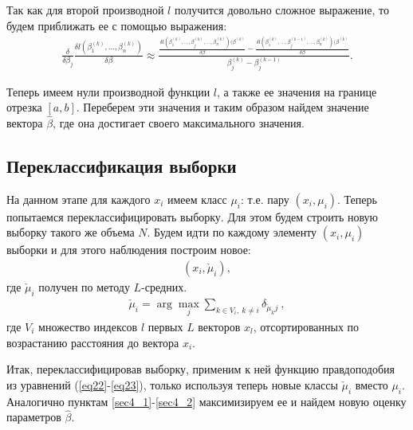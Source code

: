 \documentclass[a4paper,14pt]{extarticle}
\begin{document}
Так как для второй производной $l$ получится довольно сложное выражение, то будем приближать ее с помощью выражения:
\begin{eqnarray}
    \frac{\delta }{\delta \beta_j}\frac{\delta l(\beta_1^{(k)},\dots, \beta_n^{(k)}) }{\delta \beta}\approx \frac{\frac{\delta l(\beta_1^{(k)},\dots,\beta_j^{(k)},\dots, \beta_n^{(k)}) (\beta^{(k)}}{\delta \beta}-\frac{\delta l(\beta_1^{(k)},\dots,\beta_j^{(k-1)},\dots, \beta_n^{(k)}) (\beta^{(k)}}{\delta \beta}}{\beta_j^{(k)}-\beta_j^{(k-1)}}.
\end{eqnarray}

Теперь имеем нули производной функции $l$, а также ее значения на границе отрезка $[a,b]$.
Переберем эти значения и таким образом найдем значение вектора $\hat{\beta}$, где она достигает своего максимального значения.




\subsection{Переклассификация выборки}\label{sec4_3}
На данном этапе для каждого $x_i$ имеем класс $\mu_i$: т.е. пару $(x_i,\mu_i)$.
Теперь попытаемся переклассифицировать выборку. 
Для этом будем строить новую выборку такого же объема $N$.
Будем идти по каждому элементу $(x_i, \mu_i)$ выборки и для этого наблюдения построим новое:
\begin{eqnarray}
    (x_i, \check{\mu}_i),
\end{eqnarray}
где $\check{\mu}_i$ получен по методу $L$-средних.\hfill\break
\begin{eqnarray}
    \check{\mu}_i = \arg\max_j \sum_{k \in V_i,~k\neq i} \delta_{\check{\mu}_k j}~,
\end{eqnarray}
где $V_i$ множество индексов $l$ первых $L$ векторов $x_l$, отсортированных по возрастанию расстояния до вектора $x_i$.

Итак, переклассифицировав выборку, применим к ней функцию правдоподобия из уравнений (\ref{eq22}-\ref{eq23}), только используя теперь новые классы $\check{\mu}_i$ вместо $\mu_i$. 
Аналогично пунктам \ref{sec4_1}-\ref{sec4_2} максимизируем ее и найдем новую оценку параметров $\hat{\beta}$.

\newpage
\end{document}
